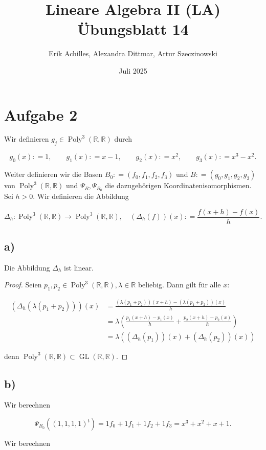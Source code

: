 \documentclass{article}
\title{Lineare Algebra II (LA) Übungsblatt 14}
\author{Erik Achilles, Alexandra Dittmar, Artur Szeczinowski}
\date{Juli 2025}
\newcommand{\RR}{\mathbb{R}}
\DeclareMathOperator{\Poly}{Poly}
\DeclareMathOperator{\GL}{GL}
\begin{document}
\section*{Aufgabe 2}

Wir definieren
$g_j \in \Poly^3(\RR, \RR)$
durch

\[
g_0(x) : = 1,
\qquad
g_1(x) : = x - 1,
\qquad
g_2(x) : = x^2,
\qquad
g_3(x) : = x^3 - x^2.
\]

Weiter definieren wir die Basen
$B_0 : = (f_0, f_1, f_2, f_3)$
und
$B : = (g_0, g_1, g_2, g_3)$
von
$\Poly^3(\RR, \RR)$
und
$\Psi_B, \Psi_{B_0}$
die dazugehörigen Koordinatenisomorphismen.
Sei
$h > 0$.
Wir definieren die Abbildung

\[
\Delta_h : \Poly^3(\RR, \RR) \to \Poly^3(\RR, \RR),
\quad
(\Delta_h(f))(x) : = \frac{f(x + h) - f(x)}{h}.
\]

\subsection*{a)}

Die Abbildung
$\Delta_h$
ist linear.

\begin{proof}
    Seien
    $p_1, p_2 \in \Poly^3(\RR,\RR), \lambda \in \RR$
    beliebig.
    Dann gilt für alle
    $ x $:
    
    \[
    \begin{aligned}
        (\Delta_h (\lambda(p_1 + p_2)))(x)
        &= 
        \frac{(\lambda(p_1 + p_2))(x + h) - (\lambda(p_1 + p_2))(x)}{h}
        \\ &=
        \lambda
        \left( \frac{p_1(x + h) - p_1(x)}{h}
        +
        \frac{p_2(x + h) - p_2(x)}{h} \right)
        \\ &= 
        \lambda
        \left( (\Delta_h (p_1))(x)
        +
        (\Delta_h (p_2))(x) \right)
    \end{aligned}
    \]
    
    denn 
    $ \Poly^3(\RR,\RR) \subset \GL(\RR,\RR) $.
\end{proof}

\subsection*{b)}

Wir berechnen

\[
\Psi_{B_0}((1,1,1,1)^t)
=
1 f_0 + 1 f_1 + 1 f_2 + 1 f_3
=
x^3 + x^2 + x + 1
.
\]

Wir berechnen
\end{document}
